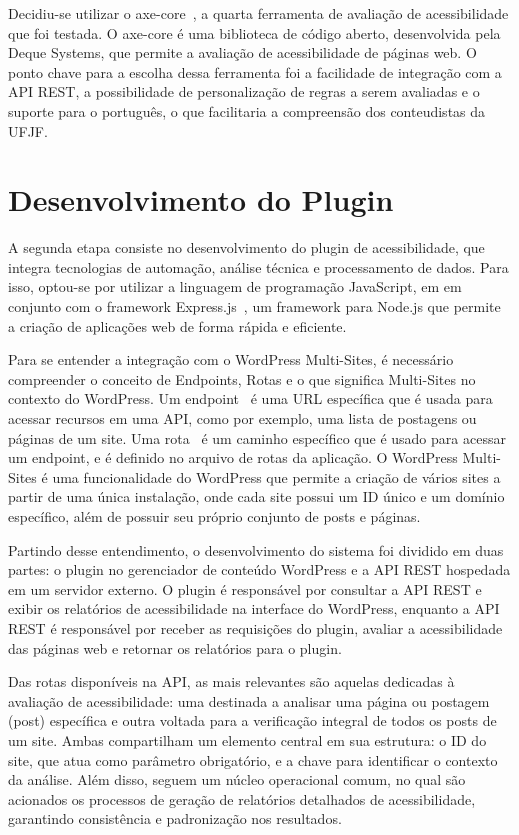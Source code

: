 \documentclass[
    12pt,
    a4paper,
    oneside,
    brazil,
    english
]{article}
\begin{document}
Decidiu-se utilizar o axe-core~\cite{axecore}, a quarta
ferramenta de avaliação de acessibilidade que foi testada. O axe-core é uma biblioteca
de código aberto, desenvolvida pela Deque Systems, que permite a avaliação de acessibilidade
de páginas web. O ponto chave para a escolha dessa ferramenta foi a facilidade
de integração com a API REST, a possibilidade de personalização de regras a serem
avaliadas e o suporte para o português, o que facilitaria a compreensão dos conteudistas
da UFJF\@.

\section*{Desenvolvimento do Plugin}
A segunda etapa consiste no desenvolvimento do plugin de acessibilidade, que
integra tecnologias de automação, análise técnica e processamento de
dados. Para isso, optou-se por utilizar a linguagem de programação JavaScript, em
em conjunto com o framework Express.js~\cite{express}, um framework
para Node.js que permite a criação de aplicações web de forma rápida
e eficiente.

Para se entender a integração com o WordPress Multi-Sites, é necessário compreender
o conceito de Endpoints, Rotas e o que significa Multi-Sites no contexto do WordPress.
Um endpoint~\cite{endpoints} é uma URL específica que é usada para acessar
recursos em uma API, como por exemplo, uma lista de postagens ou páginas de um site. Uma
rota~\cite{routes} é um caminho específico que é usado para acessar um endpoint,
e é definido no arquivo de rotas da aplicação. O WordPress Multi-Sites é uma funcionalidade
do WordPress que permite a criação de vários sites a partir de uma única instalação,
onde cada site possui um ID único e um domínio específico, além de possuir seu próprio
conjunto de posts e páginas.

Partindo desse entendimento, o desenvolvimento do sistema foi dividido em duas partes:
o plugin no gerenciador de conteúdo WordPress e a
API REST hospedada em um servidor externo. O plugin é responsável por
consultar a API REST e exibir os relatórios de acessibilidade na interface do
WordPress, enquanto a API REST é responsável por receber as requisições
do plugin, avaliar a acessibilidade das páginas web e retornar os relatórios
para o plugin.

Das rotas disponíveis na API, as mais relevantes são aquelas dedicadas
à avaliação de acessibilidade: uma destinada a analisar uma página ou postagem (post)
específica e outra voltada para a verificação integral de todos os posts de um
site. Ambas compartilham um elemento central em sua estrutura: o ID do
site, que atua como parâmetro obrigatório, e a chave para identificar o contexto
da análise. Além disso, seguem um núcleo operacional comum, no qual são
acionados os processos de geração de relatórios detalhados de acessibilidade,
garantindo consistência e padronização nos resultados.
\end{document}
